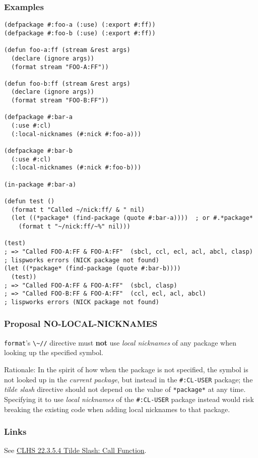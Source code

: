 \documentclass[11pt]{article}
\begin{document}
\subsubsection{Examples}
\label{sec:orgb3b3786}
\begin{verbatim}
(defpackage #:foo-a (:use) (:export #:ff))
(defpackage #:foo-b (:use) (:export #:ff))

(defun foo-a:ff (stream &rest args)
  (declare (ignore args))
  (format stream "FOO-A:FF"))

(defun foo-b:ff (stream &rest args)
  (declare (ignore args))
  (format stream "FOO-B:FF"))

(defpackage #:bar-a
  (:use #:cl)
  (:local-nicknames (#:nick #:foo-a)))

(defpackage #:bar-b
  (:use #:cl)
  (:local-nicknames (#:nick #:foo-b)))

(in-package #:bar-a)

(defun test ()
  (format t "Called ~/nick:ff/ & " nil)
  (let ((*package* (find-package (quote #:bar-a))))  ; or #.*package*
    (format t "~/nick:ff/~%" nil)))

(test)
; => "Called FOO-A:FF & FOO-A:FF"  (sbcl, ccl, ecl, acl, abcl, clasp)
; lispworks errors (NICK package not found)
(let ((*package* (find-package (quote #:bar-b))))
  (test))
; => "Called FOO-A:FF & FOO-A:FF"  (sbcl, clasp)
; => "Called FOO-B:FF & FOO-A:FF"  (ccl, ecl, acl, abcl)
; lispworks errors (NICK package not found)
\end{verbatim}
\subsubsection{Proposal NO-LOCAL-NICKNAMES}
\label{sec:org7425cd7}
\texttt{format}'s \texttt{\textbackslash{}\textasciitilde{}//} directive must \textbf{not} use \emph{local nicknames} of any package when
looking up the specified symbol.

Rationale: In the spirit of how when the package is not specified, the symbol is
not looked up in the \emph{current package}, but instead in the \texttt{\#:CL-USER} package;
the \emph{tilde slash} directive should not depend on the value of \texttt{*package*} at any
time.  Specifying it to use \emph{local nicknames} of the \texttt{\#:CL-USER} package instead
would risk breaking the existing code when adding local nicknames to that package.
\subsubsection{Links}
\label{sec:org44c87b6}
See \href{https://www.lispworks.com/documentation/HyperSpec/Body/22\_ced.htm}{CLHS 22.3.5.4 Tilde Slash: Call Function}.
\end{document}
